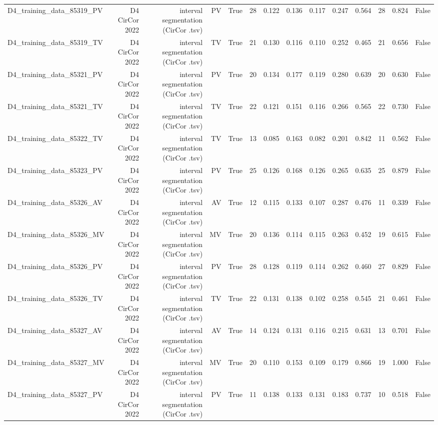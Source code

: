 \begin{table}[htbp]
\begin{tabular}{lrrrrrrrrrrrrr}
    D4\_training\_data\_85319\_PV & D4 CirCor 2022 & interval segmentation (CirCor .tsv) & PV & True & 28 & 0.122 & 0.136 & 0.117 & 0.247 & 0.564 & 28 & 0.824 & False \\
    D4\_training\_data\_85319\_TV & D4 CirCor 2022 & interval segmentation (CirCor .tsv) & TV & True & 21 & 0.130 & 0.116 & 0.110 & 0.252 & 0.465 & 21 & 0.656 & False \\
    D4\_training\_data\_85321\_PV & D4 CirCor 2022 & interval segmentation (CirCor .tsv) & PV & True & 20 & 0.134 & 0.177 & 0.119 & 0.280 & 0.639 & 20 & 0.630 & False \\
    D4\_training\_data\_85321\_TV & D4 CirCor 2022 & interval segmentation (CirCor .tsv) & TV & True & 22 & 0.121 & 0.151 & 0.116 & 0.266 & 0.565 & 22 & 0.730 & False \\
    D4\_training\_data\_85322\_TV & D4 CirCor 2022 & interval segmentation (CirCor .tsv) & TV & True & 13 & 0.085 & 0.163 & 0.082 & 0.201 & 0.842 & 11 & 0.562 & False \\
    D4\_training\_data\_85323\_PV & D4 CirCor 2022 & interval segmentation (CirCor .tsv) & PV & True & 25 & 0.126 & 0.168 & 0.126 & 0.265 & 0.635 & 25 & 0.879 & False \\
    D4\_training\_data\_85326\_AV & D4 CirCor 2022 & interval segmentation (CirCor .tsv) & AV & True & 12 & 0.115 & 0.133 & 0.107 & 0.287 & 0.476 & 11 & 0.339 & False \\
    D4\_training\_data\_85326\_MV & D4 CirCor 2022 & interval segmentation (CirCor .tsv) & MV & True & 20 & 0.136 & 0.114 & 0.115 & 0.263 & 0.452 & 19 & 0.615 & False \\
    D4\_training\_data\_85326\_PV & D4 CirCor 2022 & interval segmentation (CirCor .tsv) & PV & True & 28 & 0.128 & 0.119 & 0.114 & 0.262 & 0.460 & 27 & 0.829 & False \\
    D4\_training\_data\_85326\_TV & D4 CirCor 2022 & interval segmentation (CirCor .tsv) & TV & True & 22 & 0.131 & 0.138 & 0.102 & 0.258 & 0.545 & 21 & 0.461 & False \\
    D4\_training\_data\_85327\_AV & D4 CirCor 2022 & interval segmentation (CirCor .tsv) & AV & True & 14 & 0.124 & 0.131 & 0.116 & 0.215 & 0.631 & 13 & 0.701 & False \\
    D4\_training\_data\_85327\_MV & D4 CirCor 2022 & interval segmentation (CirCor .tsv) & MV & True & 20 & 0.110 & 0.153 & 0.109 & 0.179 & 0.866 & 19 & 1.000 & False \\
    D4\_training\_data\_85327\_PV & D4 CirCor 2022 & interval segmentation (CirCor .tsv) & PV & True & 11 & 0.138 & 0.133 & 0.131 & 0.183 & 0.737 & 10 & 0.518 & False \\

\end{tabular}
\end{table}
